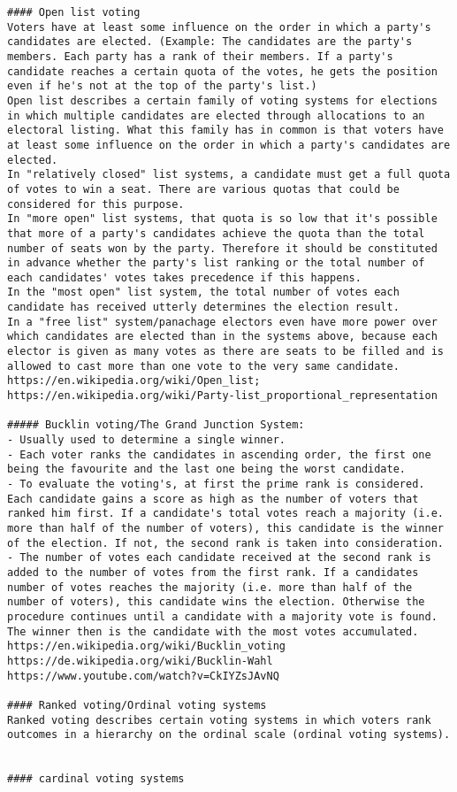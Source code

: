 {{\begin{verbatim}
#### Open list voting
Voters have at least some influence on the order in which a party's candidates are elected. (Example: The candidates are the party's members. Each party has a rank of their members. If a party's candidate reaches a certain quota of the votes, he gets the position even if he's not at the top of the party's list.) 
Open list describes a certain family of voting systems for elections in which multiple candidates are elected through allocations to an electoral listing. What this family has in common is that voters have at least some influence on the order in which a party's candidates are elected. 
In "relatively closed" list systems, a candidate must get a full quota of votes to win a seat. There are various quotas that could be considered for this purpose. 
In "more open" list systems, that quota is so low that it's possible that more of a party's candidates achieve the quota than the total number of seats won by the party. Therefore it should be constituted in advance whether the party's list ranking or the total number of each candidates' votes takes precedence if this happens.
In the "most open" list system, the total number of votes each candidate has received utterly determines the election result. 
In a "free list" system/panachage electors even have more power over which candidates are elected than in the systems above, because each elector is given as many votes as there are seats to be filled and is allowed to cast more than one vote to the very same candidate.
https://en.wikipedia.org/wiki/Open_list; https://en.wikipedia.org/wiki/Party-list_proportional_representation

##### Bucklin voting/The Grand Junction System: 
- Usually used to determine a single winner. 
- Each voter ranks the candidates in ascending order, the first one being the favourite and the last one being the worst candidate. 
- To evaluate the voting's, at first the prime rank is considered. Each candidate gains a score as high as the number of voters that ranked him first. If a candidate's total votes reach a majority (i.e. more than half of the number of voters), this candidate is the winner of the election. If not, the second rank is taken into consideration. 
- The number of votes each candidate received at the second rank is added to the number of votes from the first rank. If a candidates number of votes reaches the majority (i.e. more than half of the number of voters), this candidate wins the election. Otherwise the procedure continues until a candidate with a majority vote is found. The winner then is the candidate with the most votes accumulated.
https://en.wikipedia.org/wiki/Bucklin_voting 
https://de.wikipedia.org/wiki/Bucklin-Wahl
https://www.youtube.com/watch?v=CkIYZsJAvNQ

#### Ranked voting/Ordinal voting systems 
Ranked voting describes certain voting systems in which voters rank outcomes in a hierarchy on the ordinal scale (ordinal voting systems). 


#### cardinal voting systems


\end{verbatim}
}}%

